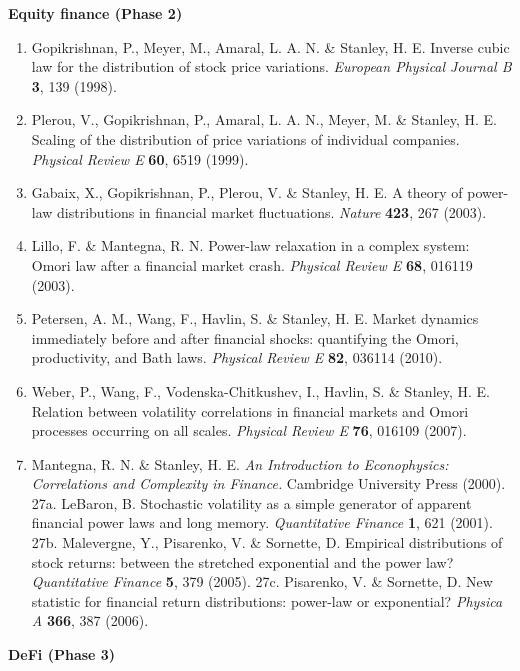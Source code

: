 \documentclass[
  11pt]{article}
\providecommand{\tightlist}{%
  \setlength{\itemsep}{0pt}\setlength{\parskip}{0pt}}
\begin{document}
\textbf{Equity finance (Phase 2)}

\begin{enumerate}
\def\labelenumi{\arabic{enumi}.}
\setcounter{enumi}{20}
\tightlist
\item
  Gopikrishnan, P., Meyer, M., Amaral, L. A. N. \& Stanley, H. E.
  Inverse cubic law for the distribution of stock price variations.
  \emph{European Physical Journal B} \textbf{3}, 139 (1998).
\item
  Plerou, V., Gopikrishnan, P., Amaral, L. A. N., Meyer, M. \& Stanley,
  H. E. Scaling of the distribution of price variations of individual
  companies. \emph{Physical Review E} \textbf{60}, 6519 (1999).
\item
  Gabaix, X., Gopikrishnan, P., Plerou, V. \& Stanley, H. E. A theory of
  power-law distributions in financial market fluctuations.
  \emph{Nature} \textbf{423}, 267 (2003).
\item
  Lillo, F. \& Mantegna, R. N. Power-law relaxation in a complex system:
  Omori law after a financial market crash. \emph{Physical Review E}
  \textbf{68}, 016119 (2003).
\item
  Petersen, A. M., Wang, F., Havlin, S. \& Stanley, H. E. Market
  dynamics immediately before and after financial shocks: quantifying
  the Omori, productivity, and Bath laws. \emph{Physical Review E}
  \textbf{82}, 036114 (2010).
\item
  Weber, P., Wang, F., Vodenska-Chitkushev, I., Havlin, S. \& Stanley,
  H. E. Relation between volatility correlations in financial markets
  and Omori processes occurring on all scales. \emph{Physical Review E}
  \textbf{76}, 016109 (2007).
\item
  Mantegna, R. N. \& Stanley, H. E. \emph{An Introduction to
  Econophysics: Correlations and Complexity in Finance.} Cambridge
  University Press (2000). 27a. LeBaron, B. Stochastic volatility as a
  simple generator of apparent financial power laws and long memory.
  \emph{Quantitative Finance} \textbf{1}, 621 (2001). 27b. Malevergne,
  Y., Pisarenko, V. \& Sornette, D. Empirical distributions of stock
  returns: between the stretched exponential and the power law?
  \emph{Quantitative Finance} \textbf{5}, 379 (2005). 27c. Pisarenko, V.
  \& Sornette, D. New statistic for financial return distributions:
  power-law or exponential? \emph{Physica A} \textbf{366}, 387 (2006).
\end{enumerate}

\textbf{DeFi (Phase 3)}
\end{document}
